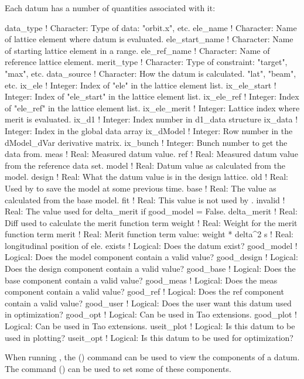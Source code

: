 Each datum has a number of quantities associated with it:
\begin{example}
  data_type        ! Character: Type of data: "orbit.x", etc.
  ele_name         ! Character: Name of lattice element where datum is evaluated.
  ele_start_name   ! Character: Name of starting lattice element in a range.
  ele_ref_name     ! Character: Name of reference lattice element.
  merit_type       ! Character: Type of constraint: "target", "max", etc.
  data_source      ! Character: How the datum is calculated. "lat", "beam", etc.
  ix_ele           ! Integer: Index of "ele" in the lattice element list.
  ix_ele_start     ! Integer: Index of "ele_start" in the lattice element list.
  ix_ele_ref       ! Integer: Index of "ele_ref" in the lattice element list.
  ix_ele_merit     ! Integer: Lattice index where merit is evaluated.
  ix_d1            ! Integer: Index number in d1_data structure
  ix_data          ! Integer: Index in the global data array
  ix_dModel        ! Integer: Row number in the dModel_dVar derivative matrix.
  ix_bunch         ! Integer: Bunch number to get the data from.
  meas             ! Real: Measured datum value. 
  ref              ! Real: Measured datum value from the reference data set.
  model            ! Real: Datum value as calculated from the model.
  design           ! Real: What the datum value is in the design lattice.
  old              ! Real: Used by \tao to save the model at some previous time.
  base             ! Real: The value as calculated from the base model.
  fit              ! Real: This value is not used by \tao.
  invalid          ! Real: The value used for delta_merit if good_model = False.
  delta_merit      ! Real: Diff used to calculate the merit function term 
  weight           ! Real: Weight for the merit function term
  merit            ! Real: Merit function term value: weight * delta^2
  s                ! Real: longitudinal position of ele.
  exists           ! Logical: Does the datum exist?
  good_model       ! Logical: Does the model  component contain a valid value?
  good_design      ! Logical: Does the design component contain a valid value?
  good_base        ! Logical: Does the base   component contain a valid value?
  good_meas        ! Logical: Does the meas   component contain a valid value?
  good_ref         ! Logical: Does the ref    component contain a valid value?
  good_user        ! Logical: Does the user want this datum used in optimization?
  good_opt         ! Logical: Can be used in Tao extensions.
  good_plot        ! Logical: Can be used in Tao extensions.
  useit_plot       ! Logical: Is this datum to be used in plotting?
  useit_opt        ! Logical: Is this datum to be used for optimization?
\end{example}
When running \tao, the 
() command can be used to view the components of a datum. 
The  command () can be used to set some of these components.

